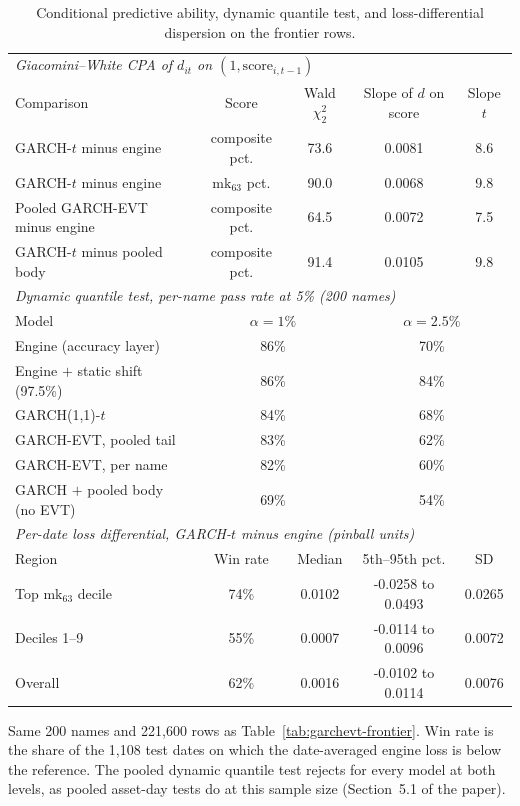 \documentclass[11pt]{article}
\begin{document}
\begin{table}[htbp]
\centering
\begin{threeparttable}
\caption{Conditional predictive ability, dynamic quantile test, and loss-differential dispersion on the frontier rows.}
\label{tab:extras}
\small
\begin{tabular}{lcccc}
\toprule
\multicolumn{5}{l}{\emph{Giacomini--White CPA of $d_{it}$ on $(1,\mathrm{score}_{i,t-1})$}} \\
Comparison & Score & Wald $\chi^2_2$ & Slope of $d$ on score & Slope $t$ \\
\midrule
GARCH-$t$ minus engine & composite pct. & 73.6 & 0.0081 & 8.6 \\
GARCH-$t$ minus engine & $\mathrm{mk}_{63}$ pct. & 90.0 & 0.0068 & 9.8 \\
Pooled GARCH-EVT minus engine & composite pct. & 64.5 & 0.0072 & 7.5 \\
GARCH-$t$ minus pooled body & composite pct. & 91.4 & 0.0105 & 9.8 \\
\midrule
\multicolumn{5}{l}{\emph{Dynamic quantile test, per-name pass rate at 5\% (200 names)}} \\
Model & \multicolumn{2}{c}{$\alpha=1\%$} & \multicolumn{2}{c}{$\alpha=2.5\%$} \\
\midrule
Engine (accuracy layer) & \multicolumn{2}{c}{86\%} & \multicolumn{2}{c}{70\%} \\
Engine $+$ static shift (97.5\%) & \multicolumn{2}{c}{86\%} & \multicolumn{2}{c}{84\%} \\
GARCH(1,1)-$t$ & \multicolumn{2}{c}{84\%} & \multicolumn{2}{c}{68\%} \\
GARCH-EVT, pooled tail & \multicolumn{2}{c}{83\%} & \multicolumn{2}{c}{62\%} \\
GARCH-EVT, per name & \multicolumn{2}{c}{82\%} & \multicolumn{2}{c}{60\%} \\
GARCH $+$ pooled body (no EVT) & \multicolumn{2}{c}{69\%} & \multicolumn{2}{c}{54\%} \\
\midrule
\multicolumn{5}{l}{\emph{Per-date loss differential, GARCH-$t$ minus engine (pinball units)}} \\
Region & Win rate & Median & 5th--95th pct. & SD \\
\midrule
Top $\mathrm{mk}_{63}$ decile & 74\% & 0.0102 & -0.0258 to 0.0493 & 0.0265 \\
Deciles 1--9 & 55\% & 0.0007 & -0.0114 to 0.0096 & 0.0072 \\
Overall & 62\% & 0.0016 & -0.0102 to 0.0114 & 0.0076 \\
\bottomrule
\end{tabular}
\begin{tablenotes}\footnotesize
\item Same 200 names and 221,600 rows as Table~\ref{tab:garchevt-frontier}. Win rate is the share of the 1,108 test dates on which the date-averaged engine loss is below the reference. The pooled dynamic quantile test rejects for every model at both levels, as pooled asset-day tests do at this sample size (Section~5.1 of the paper).
\end{tablenotes}
\end{threeparttable}
\end{table}
\end{document}
